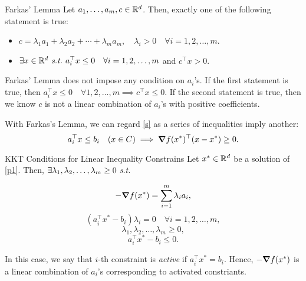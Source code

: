 \begin{lem}{Farkas' Lemma}
	Let $a_1,\dots,a_m,c\in{\mathbb{R}}^d$. Then, exactly one of the following statement is true: 
	\begin{itemize}
		\item $c=\lambda_1a_1+\lambda_2a_2+\cdots+\lambda_ma_m,\quad\lambda_i>0\quad\forall i=1,2,\dots,m$.
		\item $\exists x\in{\mathbb{R}}^d\emph{\ s.t.\ } a_i^\top x\leq0\quad\forall i=1,2,\dots,m$ and $c^\top x>0$.
	\end{itemize}	
\end{lem}
\begin{rmk}
	Farkas' Lemma does not impose any condition on $a_i$'s. If the first statement is true, then $a_i^\top x\leq0\quad\forall 1,2,\dots,m\implies c^\top x\leq0$. If the second statement is true, then we know $c$ is not a linear combination of $a_i$'s with positive coefficients.
\end{rmk}
\begin{rmk}
	With Farkas's Lemma, we can regard \eqref{s} as a series of inequalities imply another: \[a_i^\top x\leq b_i\quad(x\in C)\implies\grad f(x^*)^\top(x-x^*)\geq0.\]
\end{rmk}
\begin{thm}{KKT Conditions for Linear Inequality Constrains}
	Let $x^*\in{\mathbb{R}}^d$ be a solution of \eqref{p1}. Then, $\exists\lambda_1,\lambda_2,\dots,\lambda_m\geq0\emph{\ s.t.\ }$
	\begin{tcolorbox}[colframe=blue!40!mygreen, colback=mygreen!30!blue!5, title=KKT Conditions]
	\[-\grad f(x^*)=\sum_{i=1}^m\lambda_ia_i,\]
	\begin{equation}(a_i^\top x^*-b_i)\lambda_i=0\quad\forall i=1,2,\dots,m,\tag{Complementary Slackness Conditions}\end{equation}
	\[\lambda_1,\lambda_2,\dots,\lambda_m\geq0,\] 
	\[a_i^\top x^*-b_i\leq0.\]
	\end{tcolorbox}
	In this case, we say that $i$-th constraint is \textit{active} if $a_i^\top x^*=b_i$. Hence, $-\grad f(x^*)$ is a linear combination of $a_i$'s corresponding to activated constriants. 
\end{thm}
